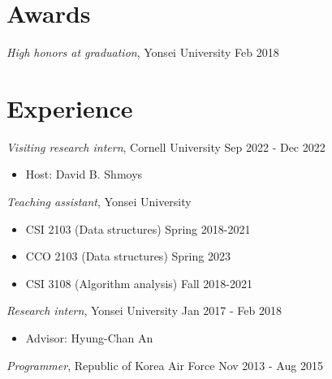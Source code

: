\documentclass[margin, 10pt]{res} %
\begin{document}
\begin{resume}

\section{Awards}
\textsl{High honors at graduation}, Yonsei University \hfill Feb 2018

\section{Experience}
\textsl{Visiting research intern}, Cornell University \hfill Sep 2022 - Dec 2022
\begin{itemize} \itemsep -2pt %
\item[] Host: David B. Shmoys
\end{itemize}

\textsl{Teaching assistant}, Yonsei University
\begin{itemize} \itemsep -2pt %
\item[] CSI 2103 (Data structures) \hfill Spring 2018-2021
\item[] CCO 2103 (Data structures) \hfill Spring 2023
\item[] CSI 3108 (Algorithm analysis) \hfill Fall 2018-2021
\end{itemize}

\textsl{Research intern}, Yonsei University \hfill Jan 2017 - Feb 2018
\begin{itemize} \itemsep -2pt %
\item[] Advisor: Hyung-Chan An
\end{itemize}

\textsl{Programmer}, Republic of Korea Air Force \hfill Nov 2013 - Aug 2015




\end{resume}
\end{document}
